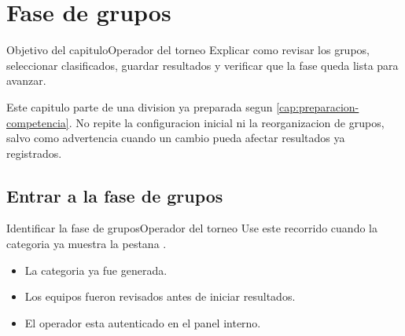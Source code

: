 \chapter{Fase de grupos}
\label{cap:fase-grupos}

\begin{procedimiento}{Objetivo del capitulo}{Operador del torneo}
Explicar como revisar los grupos, seleccionar clasificados, guardar resultados y verificar que la fase queda lista para avanzar.
\end{procedimiento}

Este capitulo parte de una division ya preparada segun \cref{cap:preparacion-competencia}. No repite la configuracion inicial ni la reorganizacion de grupos, salvo como advertencia cuando un cambio pueda afectar resultados ya registrados.

\section{Entrar a la fase de grupos}


\begin{procedimiento}{Identificar la fase de grupos}{Operador del torneo}
Use este recorrido cuando la categoria ya muestra la pestana .
\end{procedimiento}

\begin{precondiciones}
\begin{itemize}
    \item La categoria ya fue generada.
    \item Los equipos fueron revisados antes de iniciar resultados.
    \item El operador esta autenticado en el panel interno.
\end{itemize}
\end{precondiciones}


